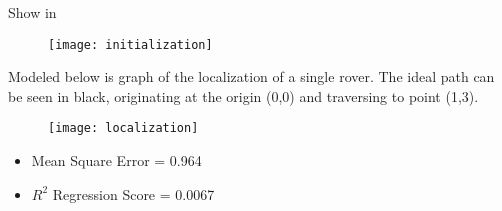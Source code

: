 Show in 
\begin{figure} \label{fig:init}
	\texttt{[image: initialization]}
\end{figure}


Modeled below is graph of the localization of a single rover. The ideal path can be seen in black, originating at the origin (0,0) and traversing to point (1,3). 

\begin{figure} \label{fig:dynamic}
	\texttt{[image: localization]}
\end{figure}


\begin{itemize}
	\item Mean Square Error = 0.964 
	\item $R^2$ Regression Score = 0.0067
\end{itemize}
